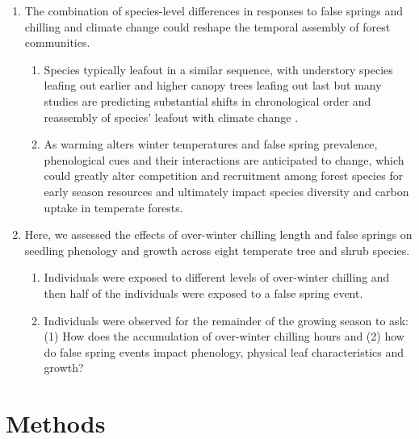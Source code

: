 \documentclass{article}\usepackage[]{graphicx}\usepackage[]{color}
\begin{document}
\begin{enumerate}
\item The combination of species-level differences in responses to false springs and chilling and climate change could reshape the temporal assembly of forest communities. 
  \begin{enumerate}
  \item Species typically leafout in a similar sequence, with understory species leafing out earlier and higher canopy trees leafing out last but many studies are predicting substantial shifts in chronological order and reassembly of species' leafout with climate change \citep{Roberts2015, Laube2014}.
  \item As warming alters winter temperatures and false spring prevalence, phenological cues and their interactions are anticipated to change, which could greatly alter competition and recruitment among forest species for early season resources and ultimately impact species diversity and carbon uptake in temperate forests.
  \end{enumerate}
  
\item Here, we assessed the effects of over-winter chilling length and false springs on seedling phenology and growth across eight temperate tree and shrub species. 
  \begin{enumerate}
  \item Individuals were exposed to different levels of over-winter chilling and then half of the individuals were exposed to a false spring event. 
  \item Individuals were observed for the remainder of the growing season to ask: (1) How does the accumulation of over-winter chilling hours and (2) how do false spring events impact phenology, physical leaf characteristics and growth?
  \end{enumerate}
\end{enumerate}
  

\section*{Methods}
\end{document}
